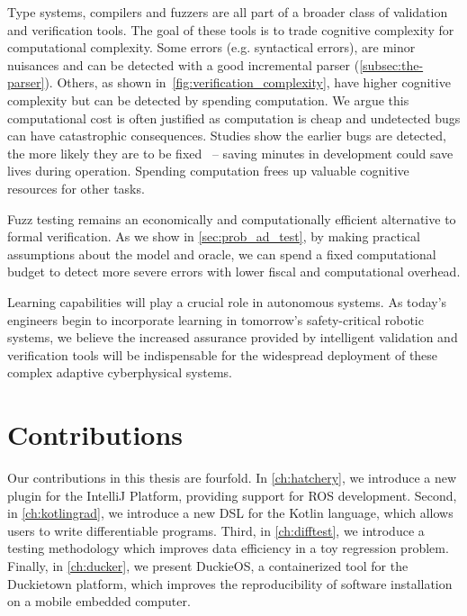 Type systems, compilers and fuzzers are all part of a broader class of validation and verification tools. The goal of these tools is to trade cognitive complexity for computational complexity. Some errors (e.g. syntactical errors), are minor nuisances and can be detected with a good incremental parser (\autoref{subsec:the-parser}). Others, as shown in~\autoref{fig:verification_complexity}, have higher cognitive complexity but can be detected by spending computation. We argue this computational cost is often justified as computation is cheap and undetected bugs can have catastrophic consequences. Studies show the earlier bugs are detected, the more likely they are to be fixed~\citep{distefano2019scaling} -- saving minutes in development could save lives during operation. Spending computation frees up valuable cognitive resources for other tasks.

Fuzz testing remains an economically and computationally efficient alternative to formal verification. As we show in \autoref{sec:prob_ad_test}, by making practical assumptions about the model and oracle, we can spend a fixed computational budget to detect more severe errors with lower fiscal and computational overhead.

Learning capabilities will play a crucial role in autonomous systems. As today's engineers begin to incorporate learning in tomorrow's safety-critical robotic systems, we believe the increased assurance provided by intelligent validation and verification tools will be indispensable for the widespread deployment of these complex adaptive cyberphysical systems.

\section{Contributions}

Our contributions in this thesis are fourfold. In \autoref{ch:hatchery}, we introduce a new plugin for the IntelliJ Platform, providing support for ROS development. Second, in \autoref{ch:kotlingrad}, we introduce a new DSL for the Kotlin language, which allows users to write differentiable programs. Third, in \autoref{ch:difftest}, we introduce a testing methodology which improves data efficiency in a toy regression problem. Finally, in \autoref{ch:ducker}, we present DuckieOS, a containerized tool for the Duckietown platform, which improves the reproducibility of software installation on a mobile embedded computer.